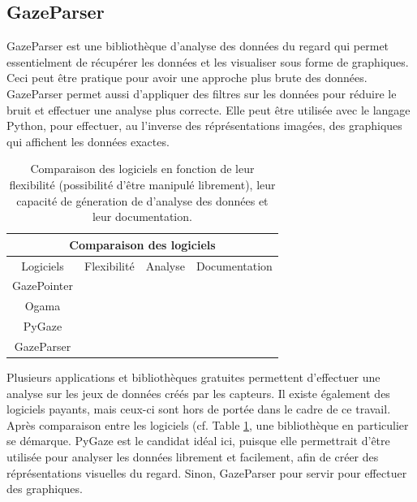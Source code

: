 \documentclass[hidelinks,12pt]{article}
\newcommand{\cmark}{\ding{51}}
\newcommand{\xmark}{\ding{55}}
\begin{document}
\subsection{GazeParser}

GazeParser \cite{gazeparser} est une bibliothèque d'analyse des données du
regard qui permet essentielment de récupérer les données et les visualiser sous
forme de graphiques. Ceci peut être pratique pour avoir une approche plus brute
des données. GazeParser permet aussi d'appliquer des filtres sur les données
pour réduire le bruit et effectuer une analyse plus correcte. Elle peut être
utilisée avec le langage Python, pour effectuer, au l'inverse des
réprésentations imagées, des graphiques qui affichent les données exactes.

\bigskip
\begin{table}[htpb]
  \begin{center}
    \begin{tabular}{|c||c|c|c|}
      \hline
      \multicolumn{4}{|c|}{Comparaison des logiciels}             \\
      \hline
      Logiciels   & Flexibilité   & Analyse       & Documentation \\
      \hline
      GazePointer & \xmark        & \cmark        & \cmark        \\
      Ogama       & \xmark        & \cmark \cmark & \cmark        \\
      PyGaze      & \cmark \cmark & \cmark \cmark & \cmark \cmark \\
      GazeParser  & \cmark        & \cmark \cmark & \cmark        \\
      \hline
    \end{tabular}
    \caption{Comparaison des logiciels en fonction de leur flexibilité
      (possibilité d'être manipulé librement), leur capacité de géneration de
      d'analyse des données et leur documentation.}
    \label{tab:comparaison}
  \end{center}
\end{table}

Plusieurs applications et bibliothèques gratuites permettent d'effectuer une
analyse sur les jeux de données créés par les capteurs. Il existe également des
logiciels payants, mais ceux-ci sont hors de portée dans le cadre de ce
travail. Après comparaison entre les logiciels (cf. Table \ref{tab:comparaison},
une bibliothèque en particulier se démarque. PyGaze est le candidat idéal ici,
puisque elle permettrait d'être utilisée pour analyser les données librement et
facilement, afin de créer des réprésentations visuelles du regard. Sinon,
GazeParser pour servir pour effectuer des graphiques.
\end{document}
